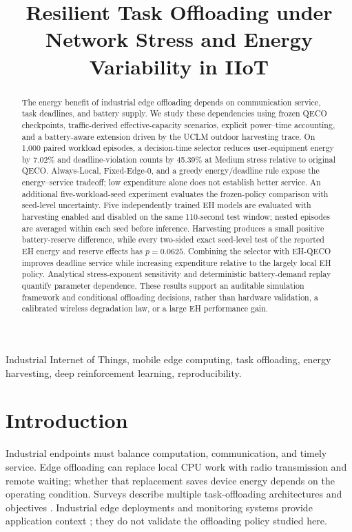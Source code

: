 \documentclass[conference]{IEEEtran}
\begin{document}
\title{Resilient Task Offloading under Network Stress and Energy Variability in IIoT}
\author{}
\maketitle
\begin{abstract}
The energy benefit of industrial edge offloading depends on communication service, task deadlines, and battery supply. We study these dependencies using frozen QECO checkpoints, traffic-derived effective-capacity scenarios, explicit power--time accounting, and a battery-aware extension driven by the UCLM outdoor harvesting trace. On 1,000 paired workload episodes, a decision-time selector reduces user-equipment energy by 7.02\% and deadline-violation counts by 45.39\% at Medium stress relative to original QECO. Always-Local, Fixed-Edge-0, and a greedy energy/deadline rule expose the energy--service tradeoff; low expenditure alone does not establish better service. An additional five-workload-seed experiment evaluates the frozen-policy comparison with seed-level uncertainty. Five independently trained EH models are evaluated with harvesting enabled and disabled on the same 110-second test window; nested episodes are averaged within each seed before inference. Harvesting produces a small positive battery-reserve difference, while every two-sided exact seed-level test of the reported EH energy and reserve effects has $p=0.0625$. Combining the selector with EH-QECO improves deadline service while increasing expenditure relative to the largely local EH policy. Analytical stress-exponent sensitivity and deterministic battery-demand replay quantify parameter dependence. These results support an auditable simulation framework and conditional offloading decisions, rather than hardware validation, a calibrated wireless degradation law, or a large EH performance gain.
\end{abstract}
\begin{IEEEkeywords}
Industrial Internet of Things, mobile edge computing, task offloading, energy harvesting, deep reinforcement learning, reproducibility.
\end{IEEEkeywords}

\section{Introduction}
Industrial endpoints must balance computation, communication, and timely service. Edge offloading can replace local CPU work with radio transmission and remote waiting; whether that replacement saves device energy depends on the operating condition. Surveys describe multiple task-offloading architectures and objectives \cite{Islam2021_supp11,Wang2020_supp14,Yang2023_supp18}. Industrial edge deployments and monitoring systems provide application context \cite{Donovan2022_supp8,Singh2024_supp3,Mirani2024_supp7}; they do not validate the offloading policy studied here.
\end{document}
